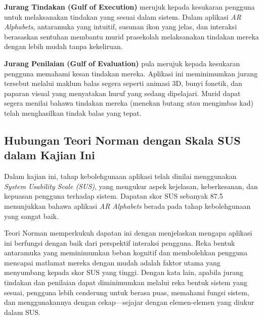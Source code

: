 \textbf{Jurang Tindakan (Gulf of Execution)} merujuk kepada kesukaran pengguna untuk melaksanakan tindakan yang sesuai dalam sistem. Dalam aplikasi \textit{AR Alphabets}, antaramuka yang intuitif, susunan ikon yang jelas, dan interaksi berasaskan sentuhan membantu murid prasekolah melaksanakan tindakan mereka dengan lebih mudah tanpa kekeliruan.

\textbf{Jurang Penilaian (Gulf of Evaluation)} pula merujuk kepada kesukaran pengguna memahami kesan tindakan mereka. Aplikasi ini meminimumkan jurang tersebut melalui maklum balas segera seperti animasi 3D, bunyi fonetik, dan paparan visual yang menyatakan huruf yang sedang dipelajari. Murid dapat segera menilai bahawa tindakan mereka (menekan butang atau mengimbas kad) telah menghasilkan tindak balas yang tepat.
\subsection{Hubungan Teori Norman dengan Skala SUS dalam Kajian Ini}

Dalam kajian ini, tahap kebolehgunaan aplikasi telah dinilai menggunakan \textit{System Usability Scale (SUS)}, yang mengukur aspek kejelasan, keberkesanan, dan kepuasan pengguna terhadap sistem. Dapatan skor SUS sebanyak 87.5 menunjukkan bahawa aplikasi \textit{AR Alphabets} berada pada tahap kebolehgunaan yang sangat baik.

Teori Norman memperkukuh dapatan ini dengan menjelaskan mengapa aplikasi ini berfungsi dengan baik dari perspektif interaksi pengguna. Reka bentuk antaramuka yang meminimumkan beban kognitif dan membolehkan pengguna mencapai matlamat mereka dengan mudah adalah faktor utama yang menyumbang kepada skor SUS yang tinggi. Dengan kata lain, apabila jurang tindakan dan penilaian dapat diminimumkan melalui reka bentuk sistem yang sesuai, pengguna lebih cenderung untuk berasa puas, memahami fungsi sistem, dan menggunakannya dengan cekap—sejajar dengan elemen-elemen yang diukur dalam SUS.

